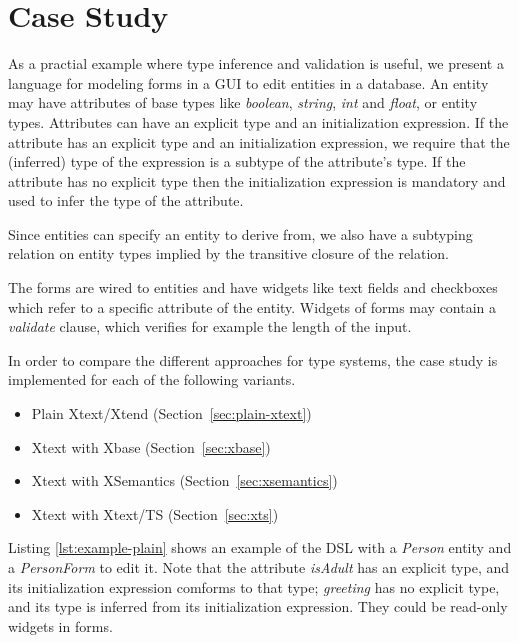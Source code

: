 \section{Case Study}
\label{sec:casestudy}

As a practial example where type inference and validation is useful, we present
a language for modeling forms in a GUI to edit entities in a database.  An
entity may have attributes of base types like \emph{boolean}, \emph{string},
\emph{int} and \emph{float}, or entity types.
Attributes can have an explicit type and an initialization expression.
If the attribute has an explicit type and an initialization expression, we
require that the (inferred) type of the expression is a subtype of the
attribute's type. If the attribute has no explicit type then the 
initialization expression is mandatory and used to infer the type of the attribute.

Since entities can specify an entity to derive from, we also have a subtyping
relation on entity types implied by the transitive closure of the 
relation.

The forms are wired to entities and have widgets like text fields and
checkboxes which refer to a specific attribute of the entity.
Widgets of forms may contain a \emph{validate} clause, which verifies for
example the length of the input.

In order to compare the different approaches for type systems, the case study is
implemented for each of the following variants.

\begin{itemize}
\item Plain Xtext/Xtend (Section~\ref{sec:plain-xtext})
\item Xtext with Xbase (Section~\ref{sec:xbase})
\item Xtext with XSemantics (Section~\ref{sec:xsemantics})
\item Xtext with Xtext/TS (Section~\ref{sec:xts})
\end{itemize}

Listing \ref{lst:example-plain} shows an example of the DSL with a \emph{Person}
entity and a \emph{PersonForm} to edit it. Note that the attribute
\emph{isAdult} has an explicit type, and its initialization expression
comforms to that type; \emph{greeting} has no explicit type, and its type is
inferred from its initialization expression.
They could be read-only widgets in forms.

%

